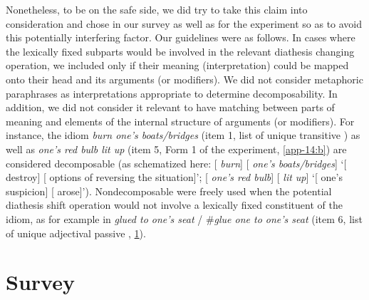 \documentclass[output=paper]{langsci/langscibook}
\begin{document}
\begin{subappendices}
Nonetheless, to be on the safe side, we did try to take this claim into
consideration and chose  in our survey as well as  for the
experiment so as to avoid this potentially interfering factor. Our guidelines
were as follows. In cases where the lexically fixed subparts would be involved
in the relevant diathesis changing operation, we included  only if their
meaning (interpretation) could be mapped onto their head and its arguments (or
modifiers). We did not consider metaphoric paraphrases as interpretations
appropriate to determine decomposability. In addition, we did not consider it
relevant to have matching between parts of meaning and elements of the internal
structure of arguments (or modifiers). For instance, the idiom \emph{burn
one’s boats/bridges} (item 1, list of unique transitive ) as well as
\emph{one’s red bulb lit up} (item 5, Form 1 of the experiment, \ref{app-14:b})
are considered decomposable (as schematized here: [ \emph{burn}]
[ \emph{one’s boats/bridges}] ‘[ destroy] [ options of
reversing the situation]’; [ \emph{one’s red bulb}] [ \emph{lit
up}] ‘[ one’s suspicion] [ arose]’). Nondecomposable  were
freely used when the potential diathesis shift operation would not involve a
lexically fixed constituent of the idiom, as for example in \emph{glued to
one’s seat} / \#\emph{glue one to one’s seat} (item 6, list of unique
adjectival passive , \ref{app-14:a}).\largerpage[1]

\vspace{-.5\baselineskip}

\section{Survey}\label{app-14:a}

\largerpage[2]

\end{subappendices}
\end{document}
